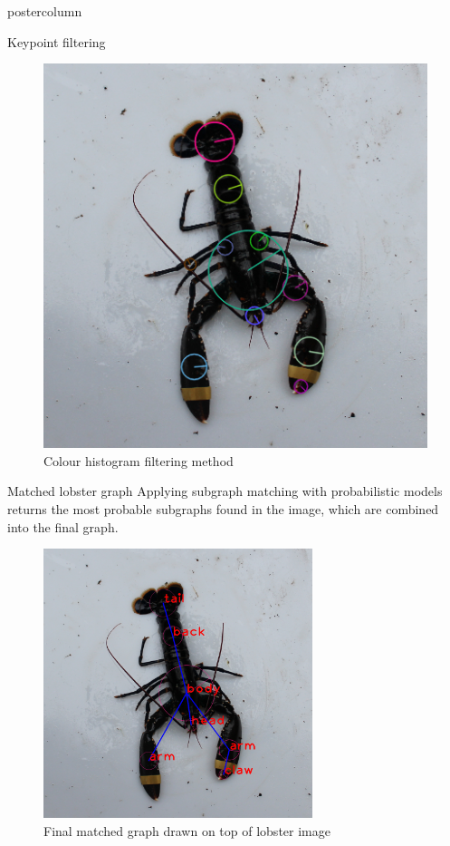 \documentclass{beamer}
\begin{document}
\begin{frame}
\begin{columns}
\begin{column}{.4\textwidth}
\begin{beamercolorbox}[center]{postercolumn}
\begin{minipage}{.98\textwidth}
{\begin{myblock}{Keypoint filtering}
\begin{center}
\begin{minipage}{0.42\textwidth}
\begin{figure}
\includegraphics[width=1\textwidth, keepaspectratio]{imgs/hist.png}
\caption{Colour histogram filtering method}
\end{figure}
\end{minipage}
\end{center}
\vspace*{-0.5cm}
\end{myblock}


\begin{myblock}{Matched lobster graph}
Applying subgraph matching with probabilistic models returns the most probable subgraphs found in the image, which are combined into the final graph.
\begin{figure}
\centering
\includegraphics[width=0.7\textwidth, keepaspectratio]{imgs/matched.png}
\caption{Final matched graph drawn on top of lobster image}
\end{figure}


\end{myblock}}
\end{minipage}
\end{beamercolorbox}
\end{column}
\end{columns}
\end{frame}
\end{document}
